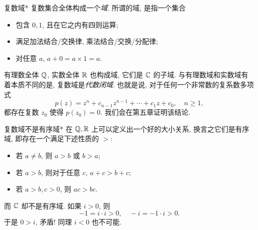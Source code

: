 


\begin{frame}{复数域*}
\onslide<+->复数集合全体构成一个\emph{域}.
\onslide<+->所谓的域, 是指一个集合
\begin{itemize}
\item 包含 $0,1$, 且在它之内有四则运算;
\item 满足加法结合/交换律, 乘法结合/交换/分配律;
\item 对任意 $a$, $a+0=a\times 1=a$.
\end{itemize}
\onslide<+->有理数全体 ${\mathbb{Q}}$, 实数全体 ${\mathbb{R}}$ 也构成域, 它们是 ${\mathbb{C}}$ 的子域.
\onslide<+->与有理数域和实数域有着本质不同的是, 复数域是\emph{代数闭域}.
\onslide<+->也就是说, 对于任何一个非常数的复系数多项式
	\[p(z)=z^n+c_{n-1}z^{n-1}+\cdots+c_1z+c_0,\quad n\ge 1,\]
\onslide<+->都存在复数 $z_0$ 使得 $p(z_0)=0$.
\onslide<+->我们会在第五章证明该结论.
\end{frame}


\begin{frame}{复数域不是有序域*}
\onslide<+->在 ${\mathbb{Q}},{\mathbb{R}}$ 上可以定义出一个好的大小关系,
\onslide<+->换言之它们是有序域, 即存在一个满足下述性质的 $>$:
\begin{itemize}
\item 若 $a\neq b$, 则 $a>b$ 或 $b>a$;
\item 若 $a>b$, 则对于任意 $c$, $a+c>b+c$;
\item 若 $a>b,c>0$, 则 $ac>bc$.
\end{itemize}
\onslide<+->而 ${\mathbb{C}}$ 却不是有序域.
\onslide<+->如果 $i>0$, 则
	\[-1=i\cdot i>0,\quad -i=-1\cdot i>0.\]
\onslide<+->于是 $0>i$, 矛盾! 同理 $i<0$ 也不可能.
\end{frame}


